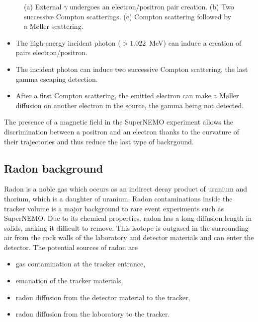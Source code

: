\begin{figure}[!h]
\begin{subfigure}[t]{0.32\textwidth}
  \captionsetup{justification=justified}
  \caption{
    \label{subfig:ext_cont_moller}}%
\end{subfigure}
\caption{(a) External $\gamma$ undergoes an electron/positron pair creation.
    (b) Two successive Compton scatterings.
  (c) Compton scattering followed by a M\o{}ller scattering.
  \label{fig:external_contamination}}
\end{figure}
\begin{itemize}
\item The high-energy incident photon ($>1.022$~MeV) can induce a creation of pairs electron/positron.
\item The incident photon can induce two successive Compton scattering, the last gamma escaping detection.
\item After a first Compton scattering, the emitted electron can make a M\o{}ller diffusion on another electron in the source, the gamma being not detected.
\end{itemize}
The presence of a magnetic field in the SuperNEMO experiment allows the discrimination between a positron and an electron thanks to the curvature of their trajectories and thus reduce the last type of backrgound.


\subsection{Radon background}

Radon is a noble gas which occurs as an indirect decay product of uranium and thorium, which is a daughter of uranium.
Radon contaminations inside the tracker volume is a major background to rare event experiments such as SuperNEMO.
Due to its chemical properties, radon has a long diffusion length in solids, making it difficult to remove.
This isotope is outgased in the surrounding air from the rock walls of the laboratory and detector materials and can enter the detector.
The potential sources of radon are
\begin{itemize}
\item gas contamination at the tracker entrance,
\item emanation of the tracker materials,
\item radon diffusion from the detector material to the tracker,
\item radon diffusion from the laboratory to the tracker.
\end{itemize}

